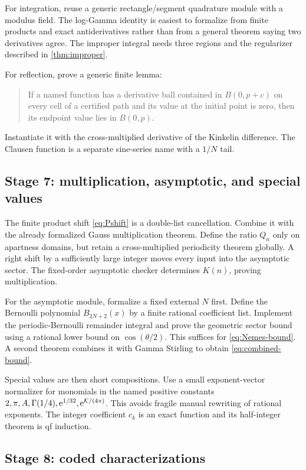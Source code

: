 For integration, reuse a generic rectangle/segment quadrature module with a
modulus field.  The log-Gamma identity is easiest to formalize from finite
products and exact antiderivatives rather than from a general theorem saying
two derivatives agree.  The improper integral needs three regions and the
regularizer described in \cref{thm:improper}.

For reflection, prove a generic finite lemma:
\begin{quote}
If a named function has a derivative ball contained in \(B(0,p+c)\) on every
cell of a certified path and its value at the initial point is zero, then its
endpoint value lies in \(B(0,p)\).
\end{quote}
Instantiate it with the cross-multiplied derivative of the Kinkelin difference.
The Clausen function is a separate sine-series name with a \(1/N\) tail.

\subsection{Stage 7: multiplication, asymptotic, and special values}

The finite product shift \cref{eq:Pshift} is a double-list cancellation.
Combine it with the already formalized Gauss multiplication theorem.  Define
the ratio \(Q_n\) only on apartness domains, but retain a cross-multiplied
periodicity theorem globally.  A right shift by a sufficiently large integer
moves every input into the asymptotic sector.  The fixed-order asymptotic
checker determines \(K(n)\), proving multiplication.

For the asymptotic module, formalize a fixed external \(N\) first.  Define the
Bernoulli polynomial \(B_{2N+2}(x)\) by a finite rational coefficient list.
Implement the periodic-Bernoulli remainder integral and prove the geometric
sector bound using a rational lower bound on \(\cos(\theta/2)\).  This suffices
for \cref{eq:Nemes-bound}.  A second theorem combines it with Gamma Stirling to
obtain \cref{eq:combined-bound}.

Special values are then short compositions.  Use a small exponent-vector
normalizer for monomials in the named positive constants
\(2,\pi,A,\Gamma(1/4),\mathrm e^{1/32},\mathrm e^{\mathcal K/(4\pi)}\).  This avoids fragile
manual rewriting of rational exponents.  The integer coefficient \(c_k\) is an
exact  function and its half-integer theorem is qf induction.

\subsection{Stage 8: coded characterizations}

